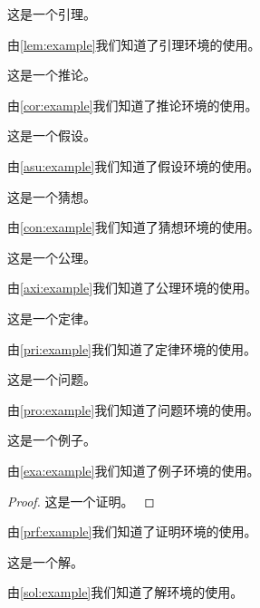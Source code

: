 \begin{lemma}
    这是一个引理。
    \label{lem:example}
\end{lemma}
由\cref{lem:example}我们知道了引理环境的使用。

\begin{corollary}
    这是一个推论。
    \label{cor:example}
\end{corollary}
由\cref{cor:example}我们知道了推论环境的使用。

\begin{assumption}
    这是一个假设。
    \label{asu:example}
\end{assumption}
由\cref{asu:example}我们知道了假设环境的使用。

\begin{conjecture}
    这是一个猜想。
    \label{con:example}
\end{conjecture}
由\cref{con:example}我们知道了猜想环境的使用。

\begin{axiom}
    这是一个公理。
    \label{axi:example}
\end{axiom}
由\cref{axi:example}我们知道了公理环境的使用。

\begin{principle}
    这是一个定律。
    \label{pri:example}
\end{principle}
由\cref{pri:example}我们知道了定律环境的使用。

\begin{problem}
    这是一个问题。
    \label{pro:example}
\end{problem}
由\cref{pro:example}我们知道了问题环境的使用。

\begin{example}
    这是一个例子。
    \label{exa:example}
\end{example}
由\cref{exa:example}我们知道了例子环境的使用。

\begin{proof}
    这是一个证明。
    \label{prf:example}
\end{proof}
由\cref{prf:example}我们知道了证明环境的使用。

\begin{solution}
    这是一个解。
    \label{sol:example}
\end{solution}
由\cref{sol:example}我们知道了解环境的使用。
